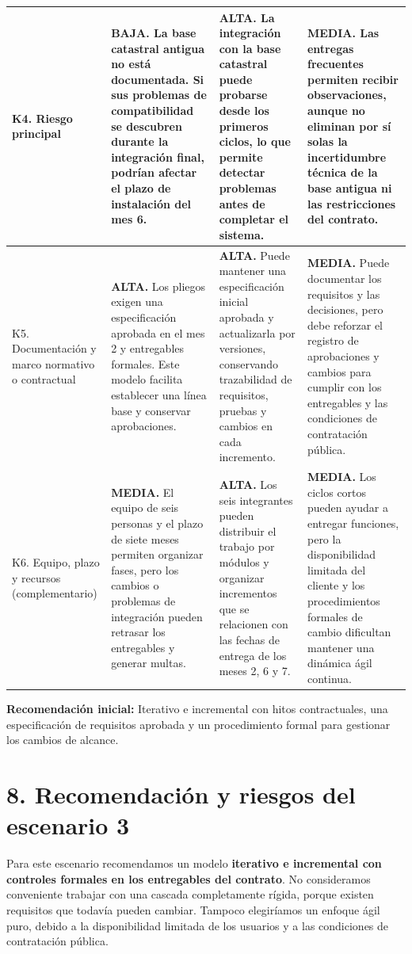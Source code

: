\documentclass[10pt,letterpaper]{article}
\newcommand{\titulo}[1]{\section*{\textcolor{verde}{#1}}}
\begin{document}
\begin{longtable}{@{}p{3.15cm}p{7.15cm}p{7.15cm}p{7.15cm}@{}}
K4. Riesgo principal&\textbf{BAJA.} La base catastral antigua no está documentada. Si sus problemas de compatibilidad se descubren durante la integración final, podrían afectar el plazo de instalación del mes 6.&\textbf{ALTA.} La integración con la base catastral puede probarse desde los primeros ciclos, lo que permite detectar problemas antes de completar el sistema.&\textbf{MEDIA.} Las entregas frecuentes permiten recibir observaciones, aunque no eliminan por sí solas la incertidumbre técnica de la base antigua ni las restricciones del contrato.\\\hline
K5. Documentación y marco normativo o contractual&\textbf{ALTA.} Los pliegos exigen una especificación aprobada en el mes 2 y entregables formales. Este modelo facilita establecer una línea base y conservar aprobaciones.&\textbf{ALTA.} Puede mantener una especificación inicial aprobada y actualizarla por versiones, conservando trazabilidad de requisitos, pruebas y cambios en cada incremento.&\textbf{MEDIA.} Puede documentar los requisitos y las decisiones, pero debe reforzar el registro de aprobaciones y cambios para cumplir con los entregables y las condiciones de contratación pública.\\\hline
K6. Equipo, plazo y recursos (complementario)&\textbf{MEDIA.} El equipo de seis personas y el plazo de siete meses permiten organizar fases, pero los cambios o problemas de integración pueden retrasar los entregables y generar multas.&\textbf{ALTA.} Los seis integrantes pueden distribuir el trabajo por módulos y organizar incrementos que se relacionen con las fechas de entrega de los meses 2, 6 y 7.&\textbf{MEDIA.} Los ciclos cortos pueden ayudar a entregar funciones, pero la disponibilidad limitada del cliente y los procedimientos formales de cambio dificultan mantener una dinámica ágil continua.\\
\end{longtable}
\par
\normalsize
\par
\textbf{Recomendación inicial:} Iterativo e incremental con hitos contractuales, una especificación de requisitos aprobada y un procedimiento formal para gestionar los cambios de alcance.
\par
\titulo{8. Recomendación y riesgos del escenario 3}
\par
Para este escenario recomendamos un modelo \textbf{iterativo e incremental con controles formales en los entregables del contrato}. No consideramos conveniente trabajar con una cascada completamente rígida, porque existen requisitos que todavía pueden cambiar. Tampoco elegiríamos un enfoque ágil puro, debido a la disponibilidad limitada de los usuarios y a las condiciones de contratación pública.
\end{document}
